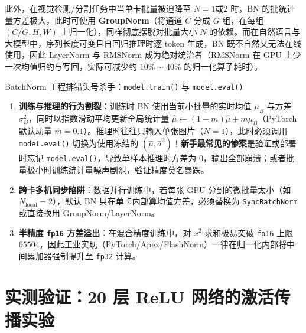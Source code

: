 此外，在视觉检测/分割任务中当单卡批量被迫降至 $N=1\text{或}2$ 时，BN 的批统计量方差极大，此时可使用 \textbf{GroupNorm}（将通道 $C$ 分成 $G$ 组，在每组 $(C/G, H, W)$ 上归一化），同样彻底摆脱对批量大小 $N$ 的依赖。而在自然语言与大模型中，序列长度可变且自回归推理时逐 token 生成，BN 既不自然又无法在线使用，因此 LayerNorm 与 RMSNorm 成为绝对统治者（RMSNorm 在 GPU 上少一次均值归约与写回，实际可减少约 $10\%\sim 40\%$ 的归一化算子耗时）。

\begin{failBox}{BatchNorm 工程排错头号杀手：\texttt{model.train()} 与 \texttt{model.eval()}}
\begin{enumerate}
  \item \textbf{训练与推理的行为割裂}：训练时 BN 使用当前小批量的实时均值 $\mu_B$ 与方差 $\sigma_B^2$，同时以指数滑动平均更新全局统计量 $\hat{\mu} \leftarrow (1-m)\hat{\mu} + m\mu_B$（PyTorch 默认动量 $m=0.1$）。推理时往往只输入单张图片（$N=1$），此时必须调用 \texttt{model.eval()} 切换为使用冻结的 $(\hat{\mu}, \hat{\sigma}^2)$！\textbf{新手最常见的惨案}是验证或部署时忘记 \texttt{model.eval()}，导致单样本推理时方差为 $0$，输出全部崩溃；或者批量极小时训练统计量噪声剧烈，验证精度莫名暴跌。
  \item \textbf{跨卡多机同步陷阱}：数据并行训练中，若每张 GPU 分到的微批量太小（如 $N_{\text{local}} = 2$），默认 BN 只在单卡内部算均值方差，必须替换为 \texttt{SyncBatchNorm} 或直接换用 GroupNorm/LayerNorm。
  \item \textbf{半精度 \texttt{fp16} 方差溢出}：在混合精度训练中，对 $x^2$ 求和极易突破 \texttt{fp16} 上限 $65504$，因此工业实现（PyTorch/Apex/FlashNorm）一律在归一化内部将中间累加器强制提升至 \texttt{fp32} 计算。
\end{enumerate}
\end{failBox}

\section{实测验证：20 层 ReLU 网络的激活传播实验}
\label{sec:exp-init}

